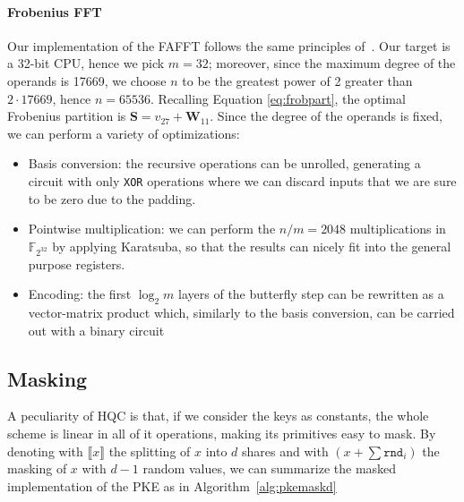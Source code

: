 \documentclass[11pt,a4paper,twocolumn]{article}
\theoremstyle{definition}
\newcommand{\ssplit}[1]{\ensuremath{ \llbracket #1 \rrbracket }}
\begin{document}
\paragraph{Frobenius FFT}
Our implementation of the FAFFT follows the same principles of~\cite{DBLP:journals/tches/ChenCK21}. Our
target is a 32-bit CPU, hence we pick $m=32$; moreover, since the maximum degree of the operands is 17669, 
we choose $n$ to be the greatest power of 2 greater than $2\cdot 17669$, hence $n=65536$. Recalling Equation
\ref{eq:frobpart}, the optimal Frobenius partition is $\mathbf{S} = v_{27}+\mathbf{W}_{11}$.
Since the degree of the operands is fixed, we can perform a variety of optimizations:
\begin{itemize}
    \item Basis conversion: the recursive operations can be unrolled, generating a circuit with only \texttt{XOR}
    operations where we can discard inputs that we are sure to be zero due to the padding.
    \item Pointwise multiplication: we can perform the $n/m=2048$ multiplications in $\mathds{F}_{2^{32}}$ by
    applying Karatsuba, so that the results can nicely fit into the general purpose registers.
    \item Encoding: the first $\log_2 m$ layers of the butterfly step can be rewritten as a vector-matrix
    product which, similarly to the basis conversion, can be carried out with a binary circuit
\end{itemize}

\subsection{Masking}
A peculiarity of HQC is that, if we consider the keys as constants, the whole scheme is linear in all of it operations,
making its primitives easy to mask. By denoting with $\ssplit{x}$ the splitting of $x$ into $d$ shares and with
$(x+\sum \texttt{rnd}_i)$ the masking of $x$ with $d-1$ random values, we can summarize the masked implementation
of the PKE as in Algorithm~\ref{alg:pkemaskd}
\end{document}
